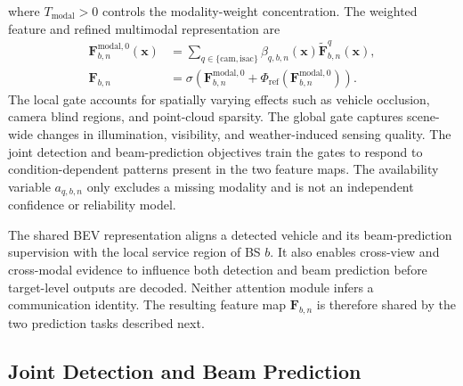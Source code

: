 where \(T_{\mathrm{modal}}>0\) controls the modality-weight concentration.  The
weighted feature and refined multimodal representation are
\begin{align}
    \mathbf{F}^{\mathrm{modal},0}_{b,n}(\mathbf{x})
    &=
    \sum_{q\in\{\mathrm{cam},\mathrm{isac}\}}
    \beta_{q,b,n}(\mathbf{x})
    \widetilde{\mathbf{F}}^{q}_{b,n}(\mathbf{x}),\\
    \mathbf{F}_{b,n}
    &=
    \sigma\!\left(
    \mathbf{F}^{\mathrm{modal},0}_{b,n}
    +\Phi_{\mathrm{ref}}\!\left(\mathbf{F}^{\mathrm{modal},0}_{b,n}\right)
    \right).
    \label{eq:method-modal-fusion}
\end{align}
The local gate accounts for spatially varying effects such as vehicle occlusion,
camera blind regions, and point-cloud sparsity.  The global gate captures
scene-wide changes in illumination, visibility, and weather-induced sensing
quality.  The joint detection and beam-prediction objectives train the gates to
respond to condition-dependent patterns present in the two feature maps.  The
availability variable \(a_{q,b,n}\) only excludes a missing modality and is not
an independent confidence or reliability model.

The shared BEV representation aligns a detected vehicle and its beam-prediction
supervision with the local service region of BS \(b\).  It also enables
cross-view and cross-modal evidence to influence both detection and beam
prediction before target-level outputs are decoded.  Neither attention module
infers a communication identity.  The resulting feature map
\(\mathbf{F}_{b,n}\) is therefore shared by the two prediction tasks described
next.

\subsection{Joint Detection and Beam Prediction}
\label{subsec:method-target-prediction}

